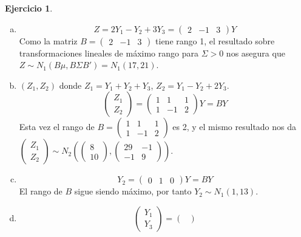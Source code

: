 \documentclass[12pt,spanish]{article}
\theoremstyle{definition}
\newtheorem{exercise}{Ejercicio}
\begin{document}
\begin{exercise}
  \begin{enumerate}[a)]
  \item \[Z=2Y_1-Y_2+3Y_3=
      \begin{pmatrix}
        2 & -1 & 3
      \end{pmatrix}
      Y
    \]
    Como la matriz $B=\begin{pmatrix}
        2 & -1 & 3
      \end{pmatrix}$ tiene rango 1, el resultado sobre
      transformaciones lineales de máximo rango para $\Sigma>0$ nos
      asegura que $Z\sim N_1(B\mu,B\Sigma B')=N_1(17,21)$.
    \item $(Z_1,Z_2)$ donde $Z_1=Y_1+Y_2+Y_3$, $Z_2=Y_1-Y_2+2Y_3$.
      \[\begin{pmatrix}
          Z_1 \\
          Z_2
        \end{pmatrix}
        =\begin{pmatrix}
          1 & 1 & 1 \\
          1 & -1 & 2
        \end{pmatrix}Y=BY
      \]
      Esta vez el rango de $B=\begin{pmatrix}
          1 & 1 & 1 \\
          1 & -1 & 2
        \end{pmatrix}$ es 2, y el mismo resultado nos da \\ $\begin{pmatrix}
          Z_1 \\
          Z_2
        \end{pmatrix}\sim N_2\left(
        \begin{pmatrix}
          8 \\ 10
        \end{pmatrix},
        \begin{pmatrix}
          29 & -1 \\
          -1 & 9
        \end{pmatrix}\right)$.
      \item \[Y_2=
      \begin{pmatrix}
        0 & 1 & 0
      \end{pmatrix}
      Y=BY
    \]
    El rango de $B$ sigue siendo máximo, por tanto $Y_2\sim N_1(1,13)$.
    \item \[\begin{pmatrix}
          Y_1 \\
          Y_3
        \end{pmatrix}
        =\begin{pmatrix}

\end{pmatrix}\]
\end{enumerate}
\end{exercise}
\end{document}
